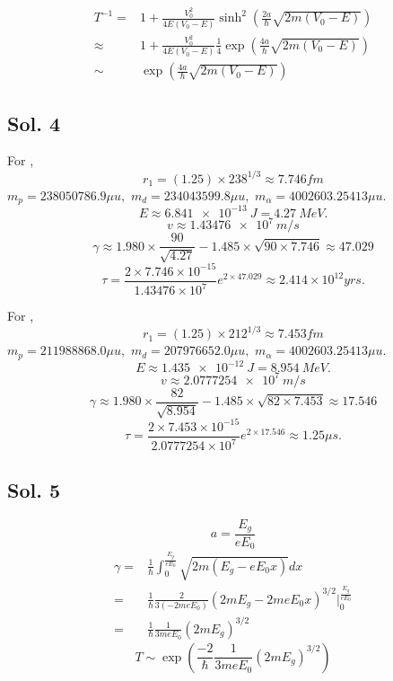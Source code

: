 \begin{align*}
    T^{-1}=&
    1+\frac{V_0^2}{4E(V_0-E)}
    \sinh^2\left(\frac{2a}{\hbar}\sqrt{2m(V_0-E)}\right)\\
    \approx&
    1+\frac{V_0^2}{4E(V_0-E)}
    \frac{1}{4}\exp
    \left(\frac{4a}{\hbar}\sqrt{2m(V_0-E)}\right)\\
    \sim &
    \exp
    \left(\frac{4a}{\hbar}\sqrt{2m(V_0-E)}\right)
\end{align*}

\subsection*{Sol. 4}
For ,
$$
r_1=(1.25)\times 238^{1/3} \approx 7.746fm
$$
$m_p = 
238050786.9 \mu u,$ 
$m_d=
234043599.8\mu u,$ 
$m_\alpha=4002603.25413\mu u.$
$$
E\approx \qty{6.841e-13}{J} = \qty{4.27}{MeV}.
$$
$$
v\approx \qty{1.43476e7}{m/s}
$$
$$
\gamma \approx 1.980\times \frac{90}{\sqrt{4.27}} - 1.485\times \sqrt{90\times 7.746}\approx 47.029
$$
$$
\tau = \frac{2\times 7.746\times 10^{-15}}
{1.43476\times 10^7}
e^{2\times 47.029} 
\approx 2.414\times 10^{12} yrs.
$$


For ,
$$
r_1=(1.25)\times 212^{1/3} \approx 7.453fm
$$
$m_p = 
211988868.0 \mu u,$ 
$m_d=
207976652.0\mu u,$ 
$m_\alpha=4002603.25413\mu u.$
$$
E\approx \qty{1.435e-12}{J} = \qty{8.954}{MeV}.
$$
$$
v\approx \qty{2.0777254e7}{m/s}
$$
$$
\gamma \approx 1.980\times \frac{82}{\sqrt{8.954}} - 1.485\times \sqrt{82\times 7.453}\approx 17.546
$$
$$
\tau = \frac{2\times 7.453\times 10^{-15}}
{2.0777254\times 10^7}
e^{2\times 17.546} 
\approx 1.25\mu s.
$$

\subsection*{Sol. 5}
$$
a = \frac{E_g}{eE_0}
$$
\begin{align*}
    \gamma =&
    \frac{1}{\hbar}
    \int_0^{\frac{E_g}{eE_0}}
    \sqrt{2m(E_g - eE_0x)}dx\\
    =&
    \frac{1}{\hbar}
    \frac{2}{3(-2meE_0)}
    (2mE_g - 2meE_0x)^{3/2}
    \bigg|^{\frac{E_g}{eE_0}}_0\\
    =&
    \frac{1}{\hbar}
    \frac{1}{3meE_0}
    (2mE_g)^{3/2}
\end{align*}
$$
T\sim \exp\left(
\frac{-2}{\hbar}
    \frac{1}{3meE_0}
    (2mE_g)^{3/2}
\right)
$$

